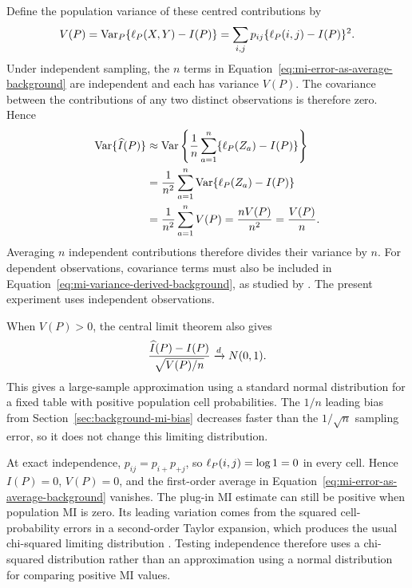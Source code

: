 \medskip
{}

Define the population variance of these centred contributions by
\begin{equation}
  V(P)
  =\operatorname{Var}_P\{\ell_P(X,Y)-I(P)\}
  =\sum_{i,j}p_{ij}\{\ell_P(i,j)-I(P)\}^2.
  \label{eq:mi-variance-background}
\end{equation}
Under independent sampling, the \(n\) terms in
Equation~\eqref{eq:mi-error-as-average-background} are independent and each
has variance \(V(P)\). The covariance between the contributions of any two
distinct observations is therefore zero. Hence
\begin{align}
  \operatorname{Var}\{\widehat I(P)\}
  &\approx
  \operatorname{Var}\left\{
    \frac{1}{n}\sum_{a=1}^{n}
    \{\ell_P(Z_a)-I(P)\}
  \right\}
  \notag\\
  &=\frac{1}{n^2}
    \sum_{a=1}^{n}\operatorname{Var}\{\ell_P(Z_a)-I(P)\}
  \notag\\
  &=\frac{1}{n^2}\sum_{a=1}^{n}V(P)
  =\frac{nV(P)}{n^2}
  =\frac{V(P)}{n}.
  \label{eq:mi-variance-derived-background}
\end{align}
Averaging \(n\) independent contributions therefore divides their variance
by \(n\). For dependent observations, covariance terms must also be included
in Equation~\eqref{eq:mi-variance-derived-background}, as studied by
\citet{moddemeijer1999}. The present experiment uses independent observations.

When \(V(P)>0\), the central limit theorem also gives
\begin{equation}
  \frac{\widehat I(P)-I(P)}{\sqrt{V(P)/n}}
  \xrightarrow{d}N(0,1).
  \label{eq:mi-clt-background}
\end{equation}
This gives a large-sample approximation using a standard normal distribution
for a fixed table with positive population cell probabilities. The \(1/n\)
leading bias from Section~\ref{sec:background-mi-bias} decreases faster than the
\(1/\sqrt n\) sampling error, so it does not change this limiting
distribution.

\medskip
{}
\nopagebreak[4]

At exact independence, \(p_{ij}=p_{i+}p_{+j}\), so
\(\ell_P(i,j)=\log 1=0\) in every cell. Hence \(I(P)=0\), \(V(P)=0\), and the
first-order average in Equation~\eqref{eq:mi-error-as-average-background}
vanishes.
The plug-in MI estimate can still be positive when population MI is zero.
Its leading variation comes from
the squared cell-probability errors in a second-order Taylor expansion, which
produces the usual chi-squared limiting distribution
\citep{brillinger2004,marinescu2025}. Testing independence therefore uses a
chi-squared distribution rather than an approximation using a normal
distribution for comparing positive MI values.

